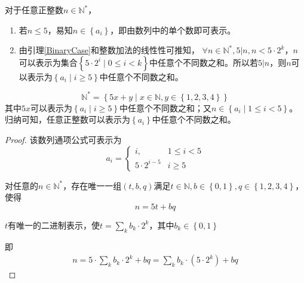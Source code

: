 \documentclass[answers]{exam}
\begin{document}
\begin{questions}
\begin{solution}
\begin{parts}
{                对于任意正整数$ n \in \mathbb{N}^*$，
                \begin{enumerate}
                    \item {
                          若$n\leq 5$，易知$n \in \left\{ a_i \right\}$，即由数列中的单个数即可表示。
                          }
                    \item {
                          由引理\ref{BinaryCase}和整数加法的线性性可推知，
                          $\forall n \in \mathbb{N}^* , 5 | n, n < 5 \cdot 2^k$，$n$可以表示为集合$\left\{ 5 \cdot 2^i \mid 0 \leq i < k \right\}$中任意个不同数之和。所以若$5|n$，则$n$可以表示为$\left\{ a_i \mid i \geq 5 \right\}$中任意个不同数之和。\label{timesOfFive}
                          }
                \end{enumerate}
                $$\mathbb{N}^* = \left\{ 5x+y \mid x \in \mathbb{N}, y\in \left\{1,2,3,4 \right\} \right\}$$
                其中$5x$可以表示为$\left\{ a_i \mid i \geq 5 \right\}$中任意个不同数之和；又$n \in \left\{ a_i \mid 1 \leq i < 5 \right\}$。归纳可知，任意正整数可以表示为$\left\{ a_i \right\}$中任意个不同数之和。
            }
        \end{parts}
    \end{solution}
    \begin{solution}
        \begin{proof}
            该数列通项公式可表示为$$ a_i =
                \begin{cases}
                    i,              & 1 \leq i < 5 \\
                    5 \cdot 2^{i-5} & i \geq 5
                \end{cases} $$

            对任意的$n \in \mathbb{N}^*$，存在唯一一组$(t,b,q)$满足$t\in \mathbb{N}, b\in \left\{0,1 \right\}, q \in \left\{ 1,2,3,4\right\}$，使得$$n = 5t+bq$$

            $t$有唯一的二进制表示，使$t = \sum_{k}{b_k \cdot 2^k}$，其中$b_k \in \left\{0,1\right\}$

            即\begin{align*}
                n = 5 \cdot \sum_{k}{b_k \cdot 2^k} + bq
                = \sum_{k}{b_k \cdot (5 \cdot 2^k)} + bq
            \end{align*}


\end{proof}
\end{solution}
\end{questions}
\end{document}
